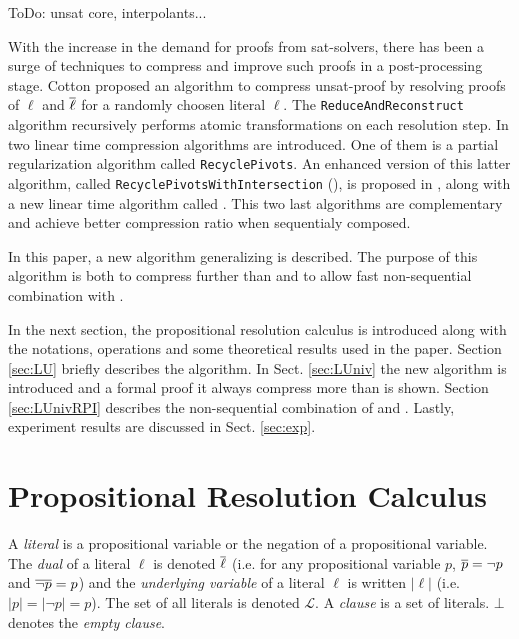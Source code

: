 \documentclass{llncs}
\begin{document}
ToDo: unsat core, interpolants...

With the increase in the demand for proofs from sat-solvers, there has been a surge of techniques to
compress and improve such proofs in a post-processing stage.
Cotton \cite{CottonSplit} proposed an
algorithm to compress unsat-proof by resolving proofs of $\ell$ and $\overline{\ell}$ for a randomly
choosen literal $\ell$.
The \texttt{ReduceAndReconstruct} algorithm \cite{RedRec} recursively
performs atomic transformations on each resolution step. In \cite{RP} two linear time compression
algorithms are introduced. One of them is a partial regularization algorithm called
\texttt{RecyclePivots}.  An enhanced version of this latter algorithm, called
\texttt{RecyclePivotsWithIntersection} ({\RPI}), is proposed in \cite{LURPI}, along with a new
linear time algorithm called {\LowerUnits}.  This two last algorithms are complementary and achieve
better compression ratio when sequentialy composed.

In this paper, a new algorithm generalizing {\LowerUnits} is described. The purpose of this algorithm
is both to compress further than {\LowerUnits} and to allow fast non-sequential combination with
{\RPI}.

In the next section, the propositional resolution calculus is introduced along with the notations, operations
and some theoretical results used in the paper. Section \ref{sec:LU} briefly describes the
{\LowerUnits} algorithm. In Sect. \ref{sec:LUniv} the new algorithm {\LowerUnivalents} is introduced and a
formal proof it always compress more than {\LowerUnits} is shown. Section \ref{sec:LUnivRPI}
describes the non-sequential combination of {\LowerUnivalents} and {\RPI}. Lastly,
experiment results are discussed in Sect. \ref{sec:exp}.



\section{Propositional Resolution Calculus}

A \emph{literal} is a propositional variable or the negation of a propositional variable. The
\emph{dual} of a literal $\ell$ is denoted $\overline{\ell}$ (i.e. for any propositional variable $p$,
$\overline{p} = \neg p$ and $\overline{\neg p} = p$) and the \emph{underlying variable} of a literal $\ell$
is written $|\ell|$ (i.e. $|p| = |\neg p| = p$). The set of all literals is denoted $\mathcal{L}$. A
\emph{clause} is a set of literals. $\bot$ denotes the \emph{empty clause}.
\end{document}
